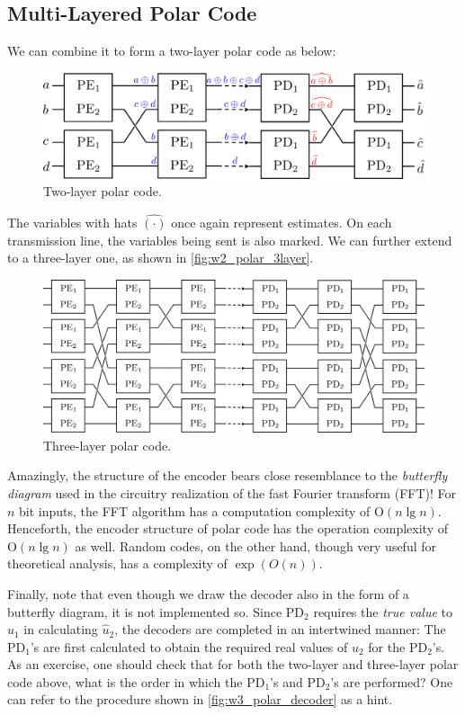 \subsection{Multi-Layered Polar Code}
We can combine it to form a two-layer polar code as below:
\begin{figure}[H]
    \centering
    \includegraphics[width=0.7\linewidth]{figures/w2_polar_2layer.png}
    \caption{Two-layer polar code.}
\end{figure}
The variables with hats $\widehat{(\cdot)}$ once again represent estimates. On each transmission line, the variables being sent is also marked. We can further extend to a three-layer one, as shown in \autoref{fig:w2_polar_3layer}.
\begin{figure}[h]
    \centering
    \includegraphics[width=0.8\linewidth]{figures/w2_polar_3layer.png}
    \caption{Three-layer polar code.}
    \label{fig:w2_polar_3layer}
\end{figure}
Amazingly, the structure of the encoder bears close resemblance to the \textit{butterfly diagram} used in the circuitry realization of the fast Fourier transform (FFT)! For $n$ bit inputs, the FFT algorithm has a computation complexity of $\mathrm{O}(n\lg n)$. Henceforth, the encoder structure of polar code has the operation complexity of $\mathrm{O}(n\lg n)$ as well. Random codes, on the other hand, though very useful for theoretical analysis, has a complexity of $\exp(O(n))$.

Finally, note that even though we draw the decoder also in the form of a butterfly diagram, it is not implemented so. Since $\mathrm{PD}_2$ requires the \textit{true value} to $u_1$ in calculating $\hat{u}_2$, the decoders are completed in an intertwined manner: The $\mathrm{PD}_1$'s are first calculated to obtain the required real values of $u_2$ for the $\mathrm{PD}_2$'s. As an exercise, one should check that for both the two-layer and three-layer polar code above, what is the order in which the $\mathrm{PD}_1$'s and $\mathrm{PD}_2$'s are performed? One can refer to the procedure shown in \autoref{fig:w3_polar_decoder} as a hint.


